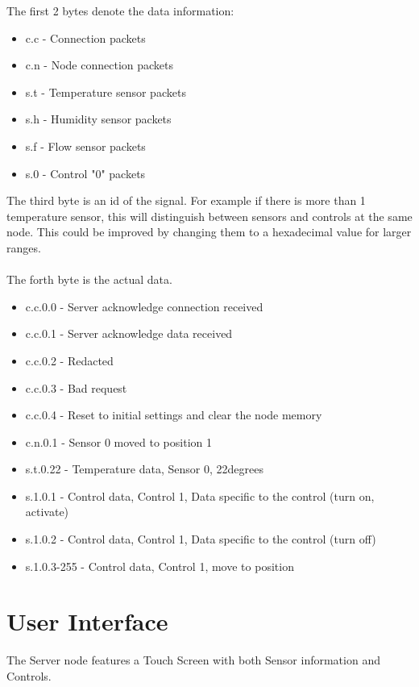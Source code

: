 \documentclass[]{report}
\begin{document}
	The first 2 bytes denote the data information:
	\begin{itemize}
		\item c.c - Connection packets
		\item c.n - Node connection packets
		\item s.t - Temperature sensor packets
		\item s.h - Humidity sensor packets
		\item s.f - Flow sensor packets
		\item s.0 - Control "0" packets
		
	\end{itemize}	
	The third byte is an id of the signal. For example if there is more than 1 temperature sensor, this will distinguish between sensors and controls at the same node. This could be improved by changing them to a hexadecimal value for larger ranges.

	\paragraph{}
	The forth byte is the actual data.
	\begin{itemize}
		\item c.c.0.0  - Server acknowledge connection received
		\item c.c.0.1  - Server acknowledge data received
		\item c.c.0.2  - Redacted
		\item c.c.0.3  - Bad request 
		\item c.c.0.4  - Reset to initial settings and clear the node memory
		\item c.n.0.1  - Sensor 0 moved to position 1
		\item s.t.0.22 - Temperature data, Sensor 0, 22degrees
		\item s.1.0.1  - Control data, Control 1, Data specific to the control (turn on, activate)
		\item s.1.0.2  - Control data, Control 1, Data specific to the control (turn off)
		\item s.1.0.3-255 - Control data, Control 1, move to position
	\end{itemize}

\section{User Interface}
	The Server node features a Touch Screen with both Sensor information and Controls.
	
\end{document}

